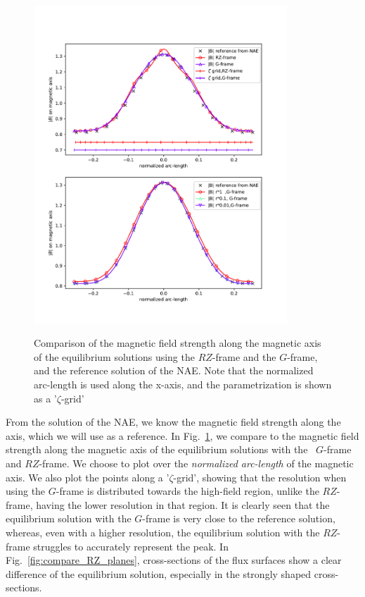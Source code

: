 \documentclass[12pt]{iopart}
\newcommand\hladdedrev[1]{#1} %
\newcommand\hlchanged[1]{#1} %
\newcommand\GFF{$G$-frame}
\newcommand\RZF{$RZ$-frame}
\begin{document}
\begin{figure}[htbp!]
    \centering
    \includegraphics[width=0.85\textwidth,trim=20 350 30 70,clip]{pics/comparison_Bnorm__r_convergence_over_arclength.pdf}\\
    \caption{Comparison of the magnetic field strength along the magnetic axis of the equilibrium solutions using the \RZF{} and the \GFF{}, and the reference solution of the NAE. \hladdedrev{Note that the normalized arc-length is used along the x-axis, and the parametrization is shown as a '$\zeta$-grid'}} 
    \label{fig:compare_normB}  
\end{figure}

From the solution of the NAE, we know the magnetic field strength along the axis, which we will use as a reference. In Fig.~\ref{fig:compare_normB}, we compare to the magnetic field strength along the magnetic axis of the equilibrium solutions with the ~\GFF{} and \RZF{}. 
\hlchanged{We choose to plot over the \emph{normalized arc-length} of the magnetic axis. We also plot
the points along a '$\zeta$-grid', showing that the resolution when using the \GFF{} is distributed towards the high-field region, unlike the \RZF{},
having the lower resolution in that region.}
It is clearly seen that the equilibrium solution with the \GFF{} is very close to the reference solution, whereas, even with a higher resolution, the equilibrium solution with the \RZF{} struggles to accurately represent the peak. In Fig.~\ref{fig:compare_RZ_planes}, cross-sections of the flux surfaces show a clear difference of the equilibrium solution, especially in the strongly shaped cross-sections.  
\end{document}
